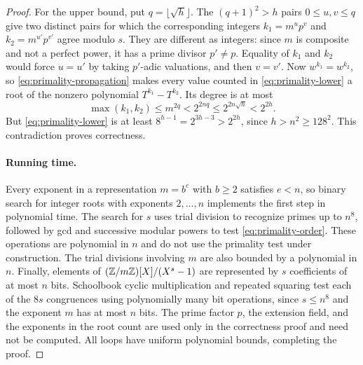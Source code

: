 \begin{proof}
For the upper bound, put $q=\lfloor\sqrt h\rfloor$.  The $(q+1)^2>h$
pairs $0\le u,v\le q$ give two distinct pairs for which the corresponding
integers $k_1=m^u p^v$ and $k_2=m^{u'}p^{v'}$ agree modulo $s$.
They are different as integers: since $m$ is composite and not a perfect
power, it has a prime divisor $p'\ne p$.  Equality of $k_1$ and $k_2$
would force $u=u'$ by taking $p'$-adic valuations, and then $v=v'$.
Now $w^{k_1}=w^{k_2}$, so \eqref{eq:primality-propagation} makes every
value counted in \eqref{eq:primality-lower} a root of the nonzero polynomial
$T^{k_1}-T^{k_2}$.  Its degree is at most
\[
 \max(k_1,k_2)\le m^{2q}
 <2^{2nq}\le2^{2n\sqrt h}<2^{2h}.
\]
But \eqref{eq:primality-lower} is at least
$8^{h-1}=2^{3h-3}>2^{2h}$, since $h>n^2\ge128^2$.
This contradiction proves correctness.

\paragraph{Running time.}
Every exponent in a representation $m=b^e$ with $b\ge2$ satisfies $e<n$,
so binary search for integer roots with exponents $2,\ldots,n$ implements
the first step in polynomial time.  The search for $s$ uses trial division
to recognize primes up to $n^8$, followed by gcd and successive modular
powers to test \eqref{eq:primality-order}.  These operations are polynomial
in $n$ and do not use the primality test under construction.  The trial
divisions involving $m$ are also bounded by a polynomial in $n$.
Finally, elements of $(\mathbb Z/m\mathbb Z)[X]/(X^s-1)$ are represented by $s$
coefficients of at most $n$ bits.  Schoolbook cyclic multiplication and
repeated squaring test each of the $8s$ congruences using polynomially many
bit operations, since $s\le n^8$ and the exponent $m$ has at most $n$ bits.
The prime factor $p$, the extension field, and the exponents in the root
count are used only in the correctness proof and need not be computed.
All loops have uniform polynomial bounds, completing the proof.
\end{proof}
